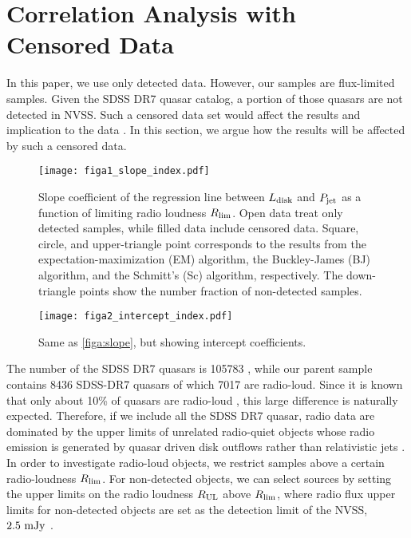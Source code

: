 \documentclass[preprint2,twocolappendix]{aastex6}
\begin{document}
\appendix
\section{Correlation Analysis with Censored Data}
\label{app:corr}
In this paper, we use only detected data. However, our samples are flux-limited samples. Given the SDSS DR7 quasar catalog, a portion of those quasars are not detected in NVSS. Such a censored data set would affect the results and implication to the data \citep[e.g.][]{iso86,bon13}. In this section, we argue how the results will be affected by such a censored data.

\begin{figure}[t]
 \begin{center}
  \texttt{[image: figa1\_slope\_index.pdf]} 
 \end{center}
\caption{Slope coefficient of the regression line between $L_{\rm disk}$ and $P_{\rm jet}$ as a function of limiting radio loudness $R_{\rm lim}$. Open data treat only detected samples, while filled data include censored data. Square, circle, and upper-triangle point corresponds to the results from the expectation-maximization (EM) algorithm, the Buckley-James (BJ) algorithm, and the Schmitt's (Sc) algorithm, respectively. The down-triangle points show the number fraction of non-detected samples.}\label{figa:slope}
\end{figure}


\begin{figure}[t]
 \begin{center}
  \texttt{[image: figa2\_intercept\_index.pdf]} 
 \end{center}
\caption{Same as \autoref{figa:slope}, but showing intercept coefficients.}\label{figa:intercept}
\end{figure}

The number of the SDSS DR7 quasars is 105783 \citep{she11}, while our parent sample contains 8436 SDSS-DR7 quasars of which 7017 are radio-loud. Since it is known that only about 10\% of quasars are radio-loud \citep{bal12}, this large difference is naturally expected. Therefore, if we include all the SDSS DR7 quasar, radio data are dominated by the upper limits of unrelated radio-quiet objects whose radio emission is generated by quasar driven disk outflows rather than relativistic jets \citep[e.g.][]{zak14}. In order to investigate radio-loud objects, we restrict samples above a certain radio-loudness $R_{\rm lim}$. For non-detected objects, we can select sources by setting the upper limits on the radio loudness $R_{\rm UL}$ above $R_{\rm lim}$, where radio flux upper limits for non-detected objects are set as the detection limit of the NVSS, $2.5~{\rm mJy}$ \citep{con98}.
\end{document}
